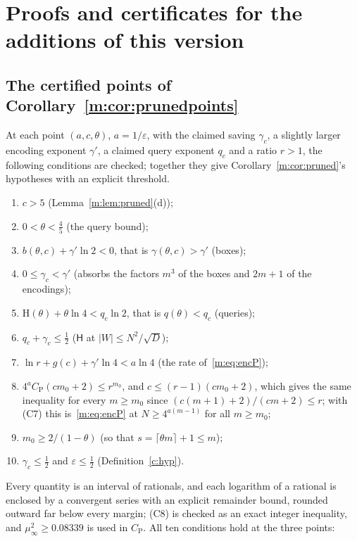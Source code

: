 \documentclass[11pt]{article}
\theoremstyle{definition}
\theoremstyle{remark}
\newcommand{\Hh}{\mathrm{H}}
\newcommand{\Hyp}{\mathsf{H}}
\begin{document}
\FloatBarrier
\section{Proofs and certificates for the additions of this version}\label{b:sec:v2}

\subsection{The certified points of Corollary~\ref{m:cor:prunedpoints}}\label{b:sec:prunedcert}

At each point $(a,c,\theta)$, $a=1/\varepsilon$, with the claimed saving $\gamma_c$, a slightly larger encoding exponent $\gamma'$, a claimed query exponent $q_c$ and a ratio $r>1$, the following conditions are checked; together they give Corollary~\ref{m:cor:pruned}'s hypotheses with an explicit threshold.
\begin{enumerate}[label=(C\arabic*),nosep]
\item $c>5$ (Lemma~\ref{m:lem:pruned}(d));
\item $0<\theta<\frac45$ (the query bound);
\item $b(\theta,c)+\gamma'\ln2<0$, that is $\gamma(\theta,c)>\gamma'$ (boxes);
\item $0\le\gamma_c<\gamma'$ (absorbs the factors $m^3$ of the boxes and $2m+1$ of the encodings);
\item $\Hh(\theta)+\theta\ln4<q_c\ln2$, that is $q(\theta)<q_c$ (queries);
\item $q_c+\gamma_c\le\frac12$ ($\Hyp$ at $|W|\le N^2/\sqrt D$);
\item $\ln r+g(c)+\gamma'\ln4<a\ln4$ (the rate of~\eqref{m:eq:encP});
\item $4^aC_{\mathrm P}(cm_0+2)\le r^{m_0}$, and $c\le(r-1)(cm_0+2)$, which gives the same inequality for every $m\ge m_0$ since $(c(m+1)+2)/(cm+2)\le r$; with (C7) this is~\eqref{m:eq:encP} at $N\ge4^{a(m-1)}$ for all $m\ge m_0$;
\item $m_0\ge2/(1-\theta)$ (so that $s=\lceil\theta m\rceil+1\le m$);
\item $\gamma_c\le\frac12$ and $\varepsilon\le\frac12$ (Definition~\ref{c:hyp}).
\end{enumerate}
Every quantity is an interval of rationals, and each logarithm of a rational is enclosed by a convergent series with an explicit remainder bound, rounded outward far below every margin; (C8) is checked as an exact integer inequality, and $\mu_\infty^2\ge0.08339$ is used in $C_{\mathrm P}$. All ten conditions hold at the three points:
\end{document}
